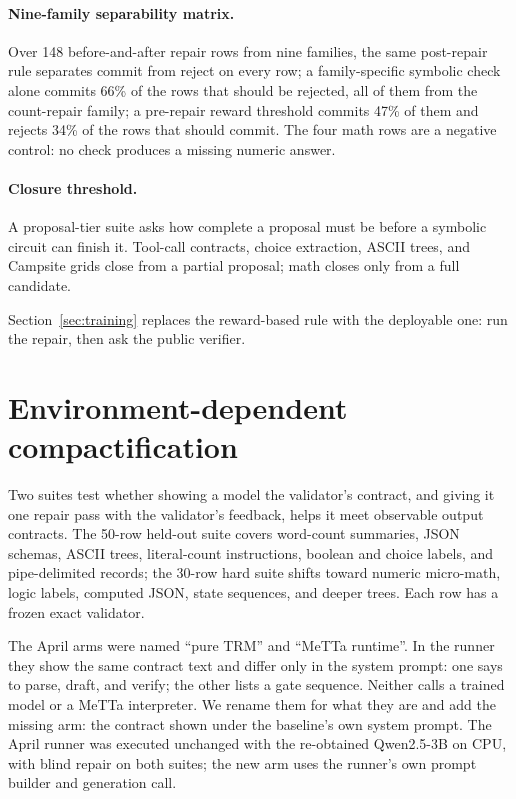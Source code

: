 \documentclass[11pt]{article}
\begin{document}
\paragraph{Nine-family separability matrix.} Over 148 before-and-after repair rows from nine families, the same post-repair rule separates commit from reject on every row; a family-specific symbolic check alone commits 66\% of the rows that should be rejected, all of them from the count-repair family; a pre-repair reward threshold commits 47\% of them and rejects 34\% of the rows that should commit. The four math rows are a negative control: no check produces a missing numeric answer.

\paragraph{Closure threshold.} A proposal-tier suite asks how complete a proposal must be before a symbolic circuit can finish it. Tool-call contracts, choice extraction, ASCII trees, and Campsite grids close from a partial proposal; math closes only from a full candidate.

Section~\ref{sec:training} replaces the reward-based rule with the deployable one: run the repair, then ask the public verifier.

\section{Environment-dependent compactification}
\label{sec:contracts}

Two suites test whether showing a model the validator's contract, and giving it one repair pass with the validator's feedback, helps it meet observable output contracts. The 50-row held-out suite covers word-count summaries, JSON schemas, ASCII trees, literal-count instructions, boolean and choice labels, and pipe-delimited records; the 30-row hard suite shifts toward numeric micro-math, logic labels, computed JSON, state sequences, and deeper trees. Each row has a frozen exact validator.

The April arms were named ``pure TRM'' and ``MeTTa runtime''. In the runner they show the same contract text and differ only in the system prompt: one says to parse, draft, and verify; the other lists a gate sequence. Neither calls a trained model or a MeTTa interpreter. We rename them for what they are and add the missing arm: the contract shown under the baseline's own system prompt. The April runner was executed unchanged with the re-obtained Qwen2.5-3B on CPU, with blind repair on both suites; the new arm uses the runner's own prompt builder and generation call.
\end{document}
